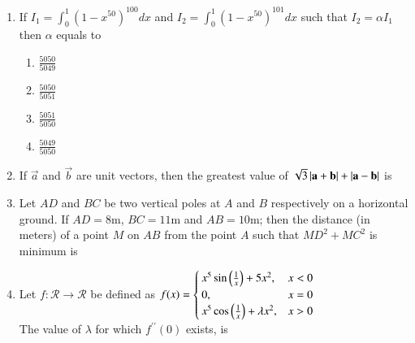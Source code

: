 \documentclass[journal]{IEEEtran}
\begin{document}
\begin{enumerate}
    \begin{multicols}{4}
    \begin{enumerate}
        \item $\frac{(t_1+t_2)}{2}$
        \item $2a(t_1+t_2)+b$
        \item $\frac{(t_2-t_1)}{2}$
        \item $a(t_2-t_1)+b$
    \end{enumerate}
    \end{multicols}
    
    \item If $I_1 = \int_{0}^{1}(1-x^{50})^{100} dx$ and $I_2 = \int_{0}^{1}(1-x^{50})^{101} dx$ such that $I_2 = \alpha I_1$ then $\alpha$ equals to
    
    \begin{multicols}{4}
    \begin{enumerate}
        \item $\frac{5050}{5049}$
        \item $\frac{5050}{5051}$
        \item $\frac{5051}{5050}$
        \item $\frac{5049}{5050}$
    \end{enumerate}
    \end{multicols}
    
    \item If $\vec{a}$ and $\vec{b}$ are unit vectors, then the greatest value of $\sqrt{3} \left\vert\mathbf{a} + \mathbf{b}\right\vert + \left\vert\mathbf{a} - \mathbf{b}\right\vert$ is \\
    
    \item Let $AD$ and $BC$ be two vertical poles at $A$ and $B$ respectively on a horizontal ground. If $AD = 8\text{m}$, $BC = 11\text{m}$ and $AB = 10\text{m}$; then the distance (in meters) of a point $M$ on $AB$ from the point $A$ such that $MD^2+MC^2$ is minimum is \\
    
    \item Let $f : \mathcal{R} \rightarrow \mathcal{R}$ be defined as $f(x)= \begin{cases}x^5\sin\left(\frac{1}{x}\right) + 5x^2,& x < 0\\
    0,& x = 0\\
    x^5\cos\left(\frac{1}{x}\right) + \lambda x^2,& x > 0\end{cases}$\\
    
    The value of $\lambda$ for which $f^{\prime\prime}(0)$ exists, is \\
    

\end{enumerate}
\end{document}
